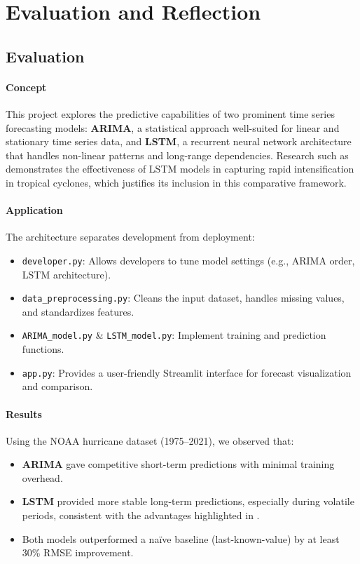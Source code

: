 %
%
%

\chapter{Evaluation and Reflection}

\section{Evaluation}

\subsubsection{Concept}
This project explores the predictive capabilities of two prominent time series forecasting models: \textbf{ARIMA}, a statistical approach well-suited for linear and stationary time series data, and \textbf{LSTM}, a recurrent neural network architecture that handles non-linear patterns and long-range dependencies. Research such as \cite{li2017lstm} demonstrates the effectiveness of LSTM models in capturing rapid intensification in tropical cyclones, which justifies its inclusion in this comparative framework.

\subsubsection{Application}
The architecture separates development from deployment:
\begin{itemize}
	\item \texttt{developer.py}: Allows developers to tune model settings (e.g., ARIMA order, LSTM architecture).
	\item \texttt{data\_preprocessing.py}: Cleans the input dataset, handles missing values, and standardizes features.
	\item \texttt{ARIMA\_model.py} \& \texttt{LSTM\_model.py}: Implement training and prediction functions.
	\item \texttt{app.py}: Provides a user-friendly Streamlit interface for forecast visualization and comparison.
\end{itemize}

\subsubsection{Results}
Using the NOAA hurricane dataset (1975–2021), we observed that:
\begin{itemize}
	\item \textbf{ARIMA} gave competitive short-term predictions with minimal training overhead.
	\item \textbf{LSTM} provided more stable long-term predictions, especially during volatile periods, consistent with the advantages highlighted in \cite{li2017lstm}.
	\item Both models outperformed a naïve baseline (last-known-value) by at least 30\% RMSE improvement.
\end{itemize}

